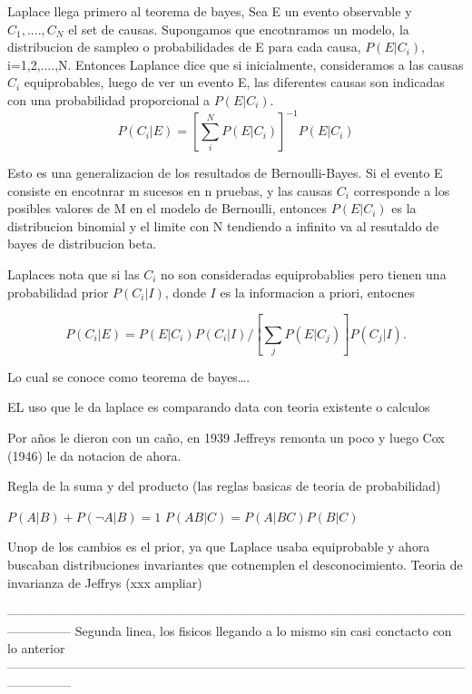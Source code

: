 \documentclass[20pt]{extarticle}
\begin{document}
Laplace llega primero  al teorema de bayes,
Sea E un evento observable y  ${C_1,....,C_N}$ el set de causas.
Supongamos que encotnramos un modelo, la distribucion de sampleo o probabilidades de E para cada causa,  $P(E|C_i)$, i=1,2,....,N. Entonces Laplance dice que si inicialmente, consideramos a las causas $C_i$ equiprobables, luego de ver un evento E, las diferentes causas son indicadas con una probabilidad proporcional  a $P(E|C_i)$.
\begin{equation}
	P(C_i|E)=[\sum_i^N P(E|C_i)]^{-1} P(E|C_i)
\end{equation}



Esto es una generalizacion de los resultados de Bernoulli-Bayes. Si el evento E consiste en encotnrar m sucesos en n pruebas, y las causas $C_i$ corresponde a los posibles valores de M en el modelo de Bernoulli, entonces $P(E|C_i)$ es la distribucion binomial y el limite con N tendiendo a infinito va al resutaldo de bayes de distribucion beta.

Laplaces nota que si las $C_i$ no son consideradas equiprobablies pero tienen una probabilidad prior $P(C_i| I )$, donde $I$ es la informacion a priori, entocnes

\begin{equation}
	P(C_i|E)=  P(E|C_i)P(C_i| I) / [\sum_j P(E|C_j)] P(C_j| I).
\end{equation}

Lo cual se conoce como teorema de bayes….

EL uso que le da laplace es comparando data con teoria existente o calculos

Por años le dieron con un caño, en 1939 Jeffreys remonta un poco y luego Cox (1946) le da notacion de ahora.

Regla de la suma y del producto (las reglas basicas de teoria de probabilidad)

$P(A|B) + P(¬A|B) = 1$
$P(AB|C) = P(A|BC)P(B|C)$


Unop de los cambios es el prior, ya que Laplace usaba equiprobable y ahora buscaban distribuciones invariantes que cotnemplen el desconocimiento. Teoria de invarianza de Jeffrys (xxx ampliar)

---------------------------------------------------------------------------------------------------------------------------
Segunda linea, los fisicos llegando a lo mismo sin casi conctacto con lo anterior
---------------------------------------------------------------------------------------------------------------------------
\end{document}
